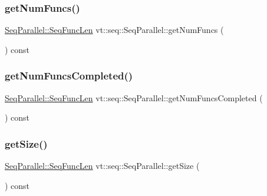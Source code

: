 \subsubsection{\texorpdfstring{get\+Num\+Funcs()}{getNumFuncs()}}
{\footnotesize\ttfamily \hyperlink{structvt_1_1seq_1_1_seq_parallel_ab6a1d3fc6dbc5210e559c96f57f64e79}{Seq\+Parallel\+::\+Seq\+Func\+Len} vt\+::seq\+::\+Seq\+Parallel\+::get\+Num\+Funcs (\begin{DoxyParamCaption}{ }\end{DoxyParamCaption}) const}

\mbox{\label{structvt_1_1seq_1_1_seq_parallel_a051904f27dbddab87b202c9bb86aa163}} 
\subsubsection{\texorpdfstring{get\+Num\+Funcs\+Completed()}{getNumFuncsCompleted()}}
{\footnotesize\ttfamily \hyperlink{structvt_1_1seq_1_1_seq_parallel_ab6a1d3fc6dbc5210e559c96f57f64e79}{Seq\+Parallel\+::\+Seq\+Func\+Len} vt\+::seq\+::\+Seq\+Parallel\+::get\+Num\+Funcs\+Completed (\begin{DoxyParamCaption}{ }\end{DoxyParamCaption}) const}

\mbox{\label{structvt_1_1seq_1_1_seq_parallel_aa8fb8295fd13135a7bd989f570fe8cb9}} 
\subsubsection{\texorpdfstring{get\+Size()}{getSize()}}
{\footnotesize\ttfamily \hyperlink{structvt_1_1seq_1_1_seq_parallel_ab6a1d3fc6dbc5210e559c96f57f64e79}{Seq\+Parallel\+::\+Seq\+Func\+Len} vt\+::seq\+::\+Seq\+Parallel\+::get\+Size (\begin{DoxyParamCaption}{ }\end{DoxyParamCaption}) const}

\mbox{\label{structvt_1_1seq_1_1_seq_parallel_a57f8521e9444d248d46957cc3677db08}} 
